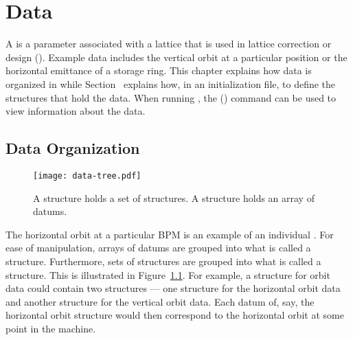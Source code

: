 \chapter{Data}
\label{c:data}

A \tao {} is a parameter associated with a lattice that is used in lattice correction or
design (). Example data includes the vertical orbit at a particular position or the
horizontal emittance of a storage ring. This chapter explains how data is organized in \tao while
Section~ explains how, in an initialization file, to define the structures that
hold the data.  When running \tao, the  () command can be used to view
information about the data.

\section{Data Organization}
\label{s:data.org}

\begin{figure}
  \centering
  \texttt{[image: data-tree.pdf]}
  \caption[Data tree structure]
{A  structure holds a set of  structures. 
A  structure holds an array of datums.}
  \label{f:data.tree}
\end{figure}

The horizontal orbit at a particular BPM is an example of an individual . For ease of
manipulation, arrays of datums are grouped into what is called a 
structure. Furthermore, sets of  structures are grouped into what is called a
 structure.  This is illustrated in Figure~\ref{f:data.tree}.  For example, a
 structure for orbit data could contain two  structures --- one 
structure for the horizontal orbit data and another  structure for the vertical orbit
data. Each datum of, say, the horizontal orbit  structure would then correspond to the
horizontal orbit at some point in the machine. 

